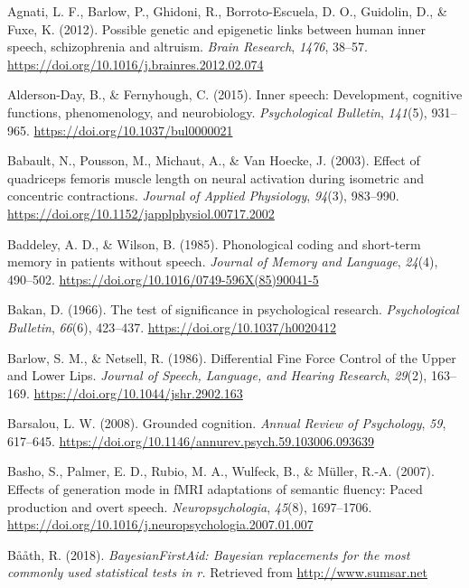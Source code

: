 \documentclass[a4paper,12pt,twoside,openright,oldfontcommands]{memoir}
\begin{document}
\hypertarget{refs}{}
\hypertarget{ref-agnati_possible_2012}{}
Agnati, L. F., Barlow, P., Ghidoni, R., Borroto-Escuela, D. O.,
Guidolin, D., \& Fuxe, K. (2012). Possible genetic and epigenetic links
between human inner speech, schizophrenia and altruism. \emph{Brain
Research}, \emph{1476}, 38--57.
\url{https://doi.org/10.1016/j.brainres.2012.02.074}

\hypertarget{ref-alderson-day_inner_2015}{}
Alderson-Day, B., \& Fernyhough, C. (2015). Inner speech: Development,
cognitive functions, phenomenology, and neurobiology.
\emph{Psychological Bulletin}, \emph{141}(5), 931--965.
\url{https://doi.org/10.1037/bul0000021}

\hypertarget{ref-babault_effect_2003}{}
Babault, N., Pousson, M., Michaut, A., \& Van Hoecke, J. (2003). Effect
of quadriceps femoris muscle length on neural activation during
isometric and concentric contractions. \emph{Journal of Applied
Physiology}, \emph{94}(3), 983--990.
\url{https://doi.org/10.1152/japplphysiol.00717.2002}

\hypertarget{ref-baddeley_phonological_1985}{}
Baddeley, A. D., \& Wilson, B. (1985). Phonological coding and
short-term memory in patients without speech. \emph{Journal of Memory
and Language}, \emph{24}(4), 490--502.
\url{https://doi.org/10.1016/0749-596X(85)90041-5}

\hypertarget{ref-bakan_test_1966}{}
Bakan, D. (1966). The test of significance in psychological research.
\emph{Psychological Bulletin}, \emph{66}(6), 423--437.
\url{https://doi.org/10.1037/h0020412}

\hypertarget{ref-barlow_differential_1986}{}
Barlow, S. M., \& Netsell, R. (1986). Differential Fine Force Control of
the Upper and Lower Lips. \emph{Journal of Speech, Language, and Hearing
Research}, \emph{29}(2), 163--169.
\url{https://doi.org/10.1044/jshr.2902.163}

\hypertarget{ref-Barsalou2008}{}
Barsalou, L. W. (2008). Grounded cognition. \emph{Annual Review of
Psychology}, \emph{59}, 617--645.
\url{https://doi.org/10.1146/annurev.psych.59.103006.093639}

\hypertarget{ref-basho_effects_2007}{}
Basho, S., Palmer, E. D., Rubio, M. A., Wulfeck, B., \& Müller, R.-A.
(2007). Effects of generation mode in fMRI adaptations of semantic
fluency: Paced production and overt speech. \emph{Neuropsychologia},
\emph{45}(8), 1697--1706.
\url{https://doi.org/10.1016/j.neuropsychologia.2007.01.007}

\hypertarget{ref-R-BayesianFirstAid}{}
Bååth, R. (2018). \emph{BayesianFirstAid: Bayesian replacements for the
most commonly used statistical tests in r.} Retrieved from
\url{http://www.sumsar.net}
\end{document}
